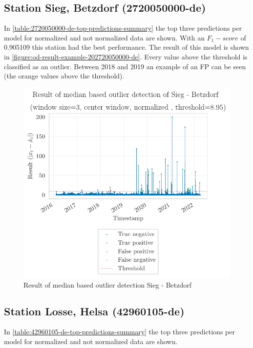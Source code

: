 

\subsection{Station Sieg, Betzdorf (2720050000-de)}
In \autoref{table:2720050000-de-top-predictions-summary} the top three predictions per model for normalized and not normalized data are shown. With an $F_1-score$ of 0.905109 this station had the best performance. The result of this model is shown in \autoref{figure:od-result-example-202720050000-de}. Every value above the threshold is classified as an outlier. Between 2018 and 2019 an example of an \ac{FP} can be seen (the orange values above the threshold).

\begin{figure}[htp]
    \centering 
    \includegraphics{plots/pdfs/2720050000-de/od_result_median_2720050000-de_all.pdf}
    \caption{Result of median based outlier detection Sieg - Betzdorf}
    \label{figure:od-result-example-202720050000-de}
\end{figure}



\subsection{Station Losse, Helsa (42960105-de)}
In \autoref{table:42960105-de-top-predictions-summary} the top three predictions per model for normalized and not normalized data are shown.


